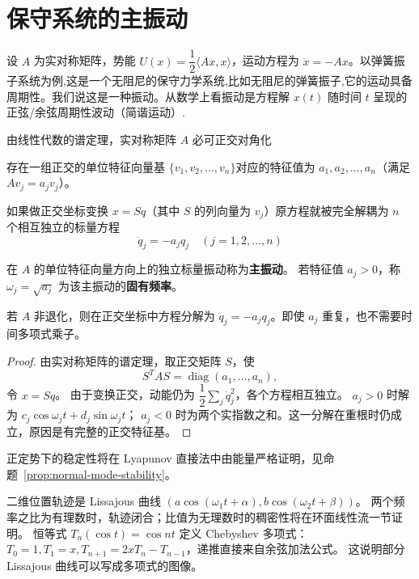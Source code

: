 \section{保守系统的主振动}\label{sec:normal-modes}
设 $A$ 为实对称矩阵，势能
$U(x)=\dfrac12\langle Ax,x\rangle$，运动方程为 $\ddot x=-Ax$。以弹簧振子系统为例,这是一个无阻尼的保守力学系统,比如无阻尼的弹簧振子,它的运动具备周期性。我们说这是一种振动。从数学上看振动是方程解 $x(t)$ 随时间 $t$ 呈现的正弦/余弦周期性波动（简谐运动）.

由线性代数的谱定理，实对称矩阵 $A$ 必可正交对角化

存在一组正交的单位特征向量基 $\{v_1, v_2, \dots, v_n\}$对应的特征值为 $a_1, a_2, \dots, a_n$（满足 $A v_j = a_j v_j$）。

如果做正交坐标变换 $x = Sq$（其中 $S$ 的列向量为 $v_j$）原方程就被完全解耦为 $n$ 个相互独立的标量方程 $$\ddot{q}_j = -a_j q_j \quad (j = 1, 2, \dots, n)$$
\begin{definition}
在 $A$ 的单位特征向量方向上的独立标量振动称为\textbf{主振动}。
若特征值 $a_j>0$，称 $\omega_j=\sqrt{a_j}$ 为该主振动的\textbf{固有频率}。
\end{definition}
\begin{theorem}
若 $A$ 非退化，则在正交坐标中方程分解为
$\ddot q_j=-a_jq_j$。即使 $a_j$ 重复，也不需要时间多项式乘子。

\end{theorem}
\begin{proof}
由实对称矩阵的谱定理，取正交矩阵 $S$，使
\[
 S^TAS=\operatorname{diag}(a_1,\ldots,a_n),
\]
令 $x=Sq$。
由于变换正交，动能仍为 $\dfrac12\sum_j\dot q_j^2$，各个方程相互独立。
$a_j>0$ 时解为 $c_j\cos\omega_jt+d_j\sin\omega_jt$；
$a_j<0$ 时为两个实指数之和。这一分解在重根时仍成立，原因是有完整的正交特征基。

\end{proof}

正定势下的稳定性将在 Lyapunov 直接法中由能量严格证明，见命题~\ref{prop:normal-mode-stability}。

二维位置轨迹是 Lissajous 曲线
$(a\cos(\omega_1t+\alpha),b\cos(\omega_2t+\beta))$。
两个频率之比为有理数时，轨迹闭合；比值为无理数时的稠密性将在环面线性流一节证明。
恒等式 $T_n(\cos t)=\cos nt$ 定义 Chebyshev 多项式：
$T_0=1,T_1=x,T_{n+1}=2xT_n-T_{n-1}$，递推直接来自余弦加法公式。
这说明部分 Lissajous 曲线可以写成多项式的图像。

